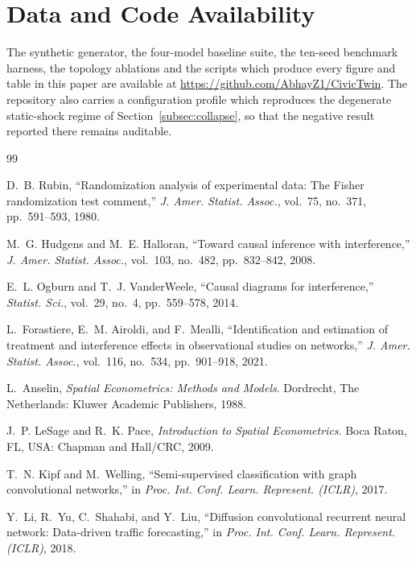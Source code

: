 \documentclass[journal]{IEEEtran}
\begin{document}
\section*{Data and Code Availability}

The synthetic generator, the four-model baseline suite, the ten-seed benchmark
harness, the topology ablations and the scripts which produce every figure and
table in this paper are available at
\url{https://github.com/AbhayZ1/CivicTwin}. The repository also carries a
configuration profile which reproduces the degenerate static-shock regime of
Section~\ref{subsec:collapse}, so that the negative result reported there
remains auditable.

\begin{thebibliography}{99}

D.~B. Rubin, ``Randomization analysis of experimental data: The Fisher
randomization test comment,'' \emph{J. Amer. Statist. Assoc.}, vol.~75,
no.~371, pp.~591--593, 1980.

M.~G. Hudgens and M.~E. Halloran, ``Toward causal inference with
interference,'' \emph{J. Amer. Statist. Assoc.}, vol.~103, no.~482,
pp.~832--842, 2008.

E.~L. Ogburn and T.~J. VanderWeele, ``Causal diagrams for interference,''
\emph{Statist. Sci.}, vol.~29, no.~4, pp.~559--578, 2014.

L.~Forastiere, E.~M. Airoldi, and F.~Mealli, ``Identification and estimation of
treatment and interference effects in observational studies on networks,''
\emph{J. Amer. Statist. Assoc.}, vol.~116, no.~534, pp.~901--918, 2021.

L.~Anselin, \emph{Spatial Econometrics: Methods and Models}. Dordrecht, The
Netherlands: Kluwer Academic Publishers, 1988.

J.~P. LeSage and R.~K. Pace, \emph{Introduction to Spatial Econometrics}. Boca
Raton, FL, USA: Chapman and Hall/CRC, 2009.

T.~N. Kipf and M.~Welling, ``Semi-supervised classification with graph
convolutional networks,'' in \emph{Proc. Int. Conf. Learn. Represent. (ICLR)},
2017.

Y.~Li, R.~Yu, C.~Shahabi, and Y.~Liu, ``Diffusion convolutional recurrent neural
network: Data-driven traffic forecasting,'' in \emph{Proc. Int. Conf. Learn.
Represent. (ICLR)}, 2018.


\end{thebibliography}
\end{document}
